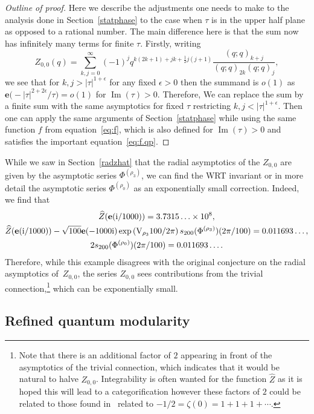 \documentclass[pdftex]{sigma}
\numberwithin{equation}{section}
\def\e{\mathbf e}
\def\VC{\mathrm{VC}}
\def\Im{\operatorname{Im}}
\def\VC{\mathrm{V}}
\begin{document}
\begin{proof}[Outline of proof]
Here we describe the adjustments one needs to make to the analysis done in Section~\ref{statphase} to the case when $\tau$ is in the upper half plane as opposed to a rational number. The main difference here is that the sum now has infinitely many terms for finite $\tau$. Firstly, writing
\[
 Z_{0,0}(q)
  =
 \sum_{k,j=0}^{\infty}(-1)^{j}q^{k(2k+1)+jk+\frac{1}{2}j(j+1)}\frac{(q;q)_{k+j}}{(q;q)_{2k}(q;q)_{j}} ,
\]
we see that for $k,j>|\tau|^{1+\epsilon}$ for any fixed $\epsilon>0$ then the summand is $o(1)$ as $\e\bigl(-|\tau|^{2+2\epsilon}/\tau\bigr)=o(1)$ for $\Im(\tau)>0$. Therefore, We can replace the sum by a finite sum with the same asymptotics for fixed $\tau$ restricting $k,j<|\tau|^{1+\epsilon}$. Then one can apply the same arguments of Section~\ref{statphase} while using the same function $f$ from equation~\eqref{eq:f}, which is also defined for $\Im(\tau)>0$ and satisfies the important equation~\eqref{eq:f.qp}.
\end{proof}

While we saw in Section~\ref{radzhat} that the radial asymptotics of the $Z_{0,0}$ are given by the asymptotic series $\Phi^{(\rho_{3})}$, we can find the WRT invariant or in more detail the asymptotic series $\Phi^{(\rho_{0})}$ as an exponentially small correction. Indeed, we find that
\begin{gather*}
 \widehat{Z}(\e({\rm i}/1000))
  =3.7315\ldots\times10^8,\\
 \widehat{Z}(\e({\rm i}/1000))-\sqrt{100} \e(-1000 {\rm i})\exp\left(\VC_{\rho_3}100/2\pi\right)s_{200}(\Phi^{(\rho_3)})(2\pi/100)
  =0.011693\ldots,\\
 2s_{200}(\Phi^{(\rho_0)})(2\pi/100)
  =0.011693\ldots .
\end{gather*}
Therefore, while this example disagrees with the original conjecture on the radial asymptotics of~$Z_{0,0}$, the series $Z_{0,0}$ sees contributions from the trivial connection,\footnote{Note that there is an additional factor of $2$ appearing in front of the asymptotics of the trivial connection, which indicates that it would be natural to halve $Z_{0,0}$. Integrability is often wanted for the function $\widehat{Z}$ as it is hoped this will lead to a categorification however these factors of $2$ could be related to those found in~\cite{GPPV} related to $-1/2=\zeta(0)=1+1+1+\cdots$.} which can be exponentially small.

\subsection{Refined quantum modularity}\label{sec:RQMOD}
\end{document}

